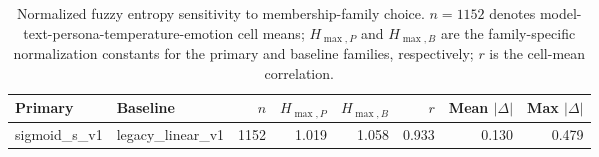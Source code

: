 \begin{table}[t]
\centering
\caption{Normalized fuzzy entropy sensitivity to membership-family choice. $n=1152$ denotes model-text-persona-temperature-emotion cell means; $H_{\max,P}$ and $H_{\max,B}$ are the family-specific normalization constants for the primary and baseline families, respectively; $r$ is the cell-mean correlation.}
\label{tab:scis-entropy-sensitivity}
\begin{tabular}{llrrrrrr}
\hline
Primary & Baseline & $n$ & $H_{\max,P}$ & $H_{\max,B}$ & $r$ & Mean $|\Delta|$ & Max $|\Delta|$ \\
\hline
sigmoid\_s\_v1 & legacy\_linear\_v1 & 1152 & 1.019 & 1.058 & 0.933 & 0.130 & 0.479 \\
\hline
\end{tabular}
\end{table}

